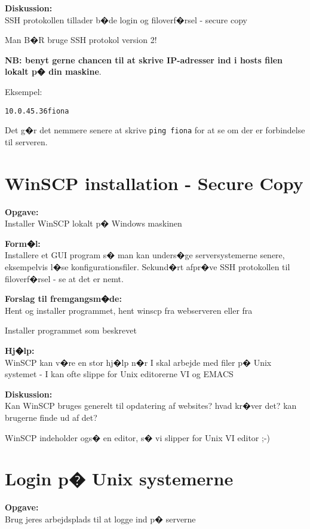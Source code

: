 \documentclass[a4paper,11pt,notitlepage]{oevelser}
\begin{document}
{\bfseries Diskussion:}\\
SSH protokollen tillader b�de login og filoverf�rsel - secure copy

Man B�R bruge SSH protokol version 2!

{\bf NB: benyt gerne chancen til at skrive IP-adresser ind i hosts
filen lokalt p� din maskine}.

Eksempel:
\begin{alltt}
10.0.45.36    fiona
\end{alltt}

Det g�r det nemmere senere at skrive \verb+ping fiona+ for at se om
der er forbindelse til serveren.


\chapter{WinSCP installation - Secure Copy}
\label{ex:winscp-install}

{\bfseries Opgave:}\\
Installer WinSCP lokalt p� Windows maskinen

{\bfseries Form�l:}\\
Installere et GUI program s� man kan unders�ge serversystemerne senere, eksempelvis l�se konfigurationsfiler. Sekund�rt afpr�ve SSH protokollen til filoverf�rsel - se at det er nemt.

{\bfseries Forslag til fremgangsm�de:}\\
Hent og installer programmet, hent winscp fra webserveren eller fra\\

Installer programmet som beskrevet

{\bfseries Hj�lp:}\\
WinSCP kan v�re en stor hj�lp n�r I skal arbejde med filer p� Unix
systemet - I kan ofte slippe for Unix editorerne VI og EMACS

{\bfseries Diskussion:}\\
Kan WinSCP bruges generelt til opdatering af websites? hvad kr�ver
det? kan brugerne finde ud af det?

WinSCP indeholder ogs� en editor, s� vi slipper for Unix VI editor ;-)

\chapter{Login p� Unix systemerne}
\label{ex:unix-login}

{\bfseries Opgave:}\\
Brug jeres arbejdsplads til at logge ind p� serverne
\end{document}
